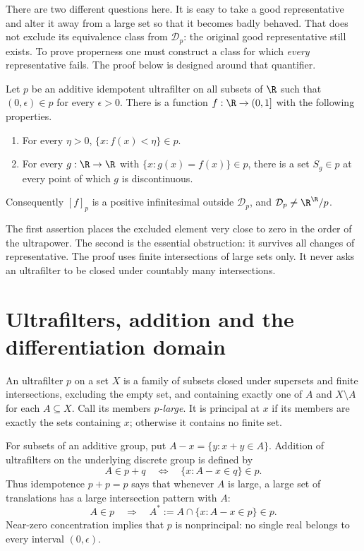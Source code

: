 \documentclass[11pt]{article}
\begin{document}
There are two different questions here. It is easy to take a good
representative and alter it away from a large set so that it becomes
badly behaved. That does not exclude its equivalence class from
$\mathcal D_p$: the original good representative still exists. To prove
properness one must construct a class for which \emph{every}
representative fails. The proof below is designed around that quantifier.

\begin{theorem}\label{thm:main}
Let $p$ be an additive idempotent ultrafilter on all subsets of $\R$
such that $(0,\epsilon)\in p$ for every $\epsilon>0$. There is a function
$f:\R\to(0,1]$ with the following properties.
\begin{enumerate}
\item For every $\eta>0$, $\{x:f(x)<\eta\}\in p$.
\item For every $g:\R\to\R$ with $\{x:g(x)=f(x)\}\in p$, there is a set
      $S_g\in p$ at every point of which $g$ is discontinuous.
\end{enumerate}
Consequently $[f]_p$ is a positive infinitesimal outside $\mathcal D_p$,
and $\mathcal D_p\ne\R^{\R}/p$.
\end{theorem}

The first assertion places the excluded element very close to zero in
the order of the ultrapower. The second is the essential obstruction:
it survives all changes of representative. The proof uses finite
intersections of large sets only. It never asks an ultrafilter to be
closed under countably many intersections.

\section{Ultrafilters, addition and the differentiation domain}

An ultrafilter $p$ on a set $X$ is a family of subsets closed under
supersets and finite intersections, excluding the empty set, and
containing exactly one of $A$ and $X\setminus A$ for each $A\subseteq X$.
Call its members \emph{$p$-large}. It is principal at $x$ if its members
are exactly the sets containing $x$; otherwise it contains no finite set.

For subsets of an additive group, put $A-x=\{y:x+y\in A\}$. Addition of
ultrafilters on the underlying discrete group is defined by
\[
 A\in p+q \quad\Longleftrightarrow\quad
 \{x:A-x\in q\}\in p.
\]
Thus idempotence $p+p=p$ says that whenever $A$ is large, a large set of
translations has a large intersection pattern with $A$:
\begin{equation}\label{eq:star}
 A\in p\quad\Longrightarrow\quad
 A^*:=A\cap\{x:A-x\in p\}\in p.
\end{equation}
Near-zero concentration implies that $p$ is nonprincipal: no single real
belongs to every interval $(0,\epsilon)$.
\end{document}
